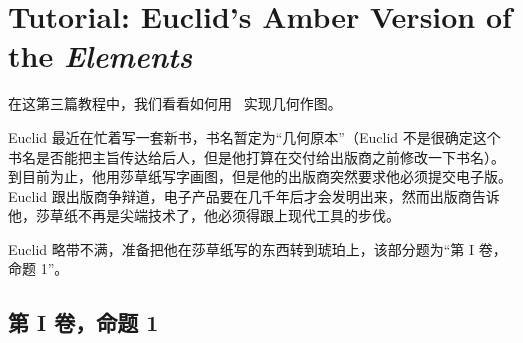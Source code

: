 %
%
%


\section{Tutorial: Euclid's Amber Version of the \emph{Elements}}

\bohs

在这第三篇教程中，我们看看如何用 \tikzname\ 实现几何作图。

Euclid 最近在忙着写一套新书，书名暂定为“几何原本”（Euclid 不是很确定这个书名是否能把主旨传达给后人，但是他打算在交付给出版商之前修改一下书名）。
到目前为止，他用莎草纸写字画图，但是他的出版商突然要求他必须提交电子版。
Euclid 跟出版商争辩道，电子产品要在几千年后才会发明出来，然而出版商告诉他，莎草纸不再是尖端技术了，他必须得跟上现代工具的步伐。

Euclid 略带不满，准备把他在莎草纸写的东西转到琥珀上，该部分题为“第 I 卷，命题 1”。

\eohs

\subsection{第 I 卷，命题 1}

